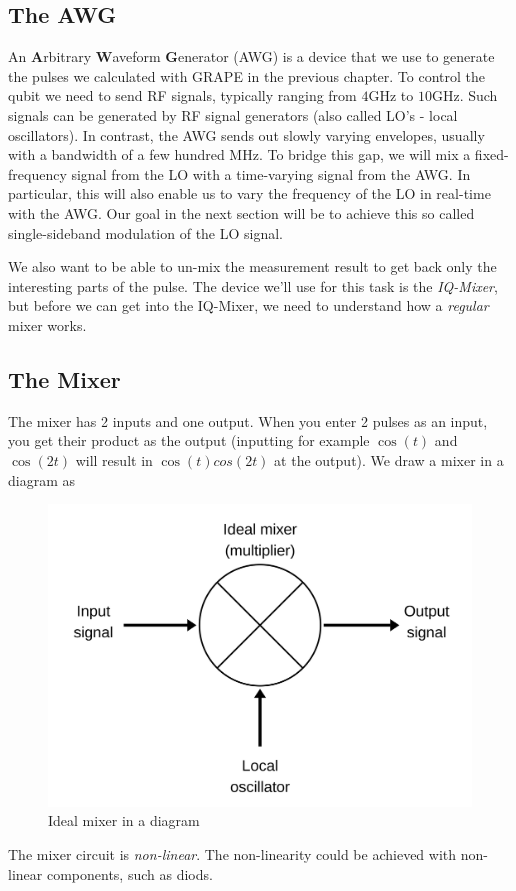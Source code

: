 \subsection{The AWG}

An \textbf{A}rbitrary \textbf{W}aveform \textbf{G}enerator (AWG) is a device that we use to generate the pulses we calculated with GRAPE in the previous chapter. To control the qubit we need to send RF signals, typically ranging from $4$GHz to $10$GHz. Such signals can be generated by RF signal generators (also called LO's - local oscillators). In contrast, the AWG sends out slowly varying envelopes, usually with a bandwidth of a few hundred MHz. To bridge this gap, we will mix a fixed-frequency signal from the LO with a time-varying signal from the AWG. In particular, this will also enable us to vary the frequency of the LO in real-time with the AWG. Our goal in the next section will be to achieve this so called single-sideband modulation of the LO signal.

We also want to be able to un-mix the measurement result to get back only the interesting parts of the pulse. The device we'll use for this task is the \textit{IQ-Mixer}, but before we can  get into the IQ-Mixer, we need to understand how a \textit{regular} mixer works.

\subsection{The Mixer}
The mixer has 2 inputs and one output. When you enter 2 pulses as an input, you get their product as the output (inputting for example $\cos (t)$ and $\cos (2t)$ will result in $\cos (t)cos (2t)$ at the output).
We draw a mixer in a diagram as
\begin{figure}[H]
    \centering
    \includegraphics[width=0.5\columnwidth]{gfx/Ideal-Mixer.png}
    \caption{Ideal mixer in a diagram}
    \label{fig:Ideal-Mixer}
\end{figure}
The mixer circuit is \textit{non-linear}. The non-linearity could be achieved with non-linear components, such as diods.

